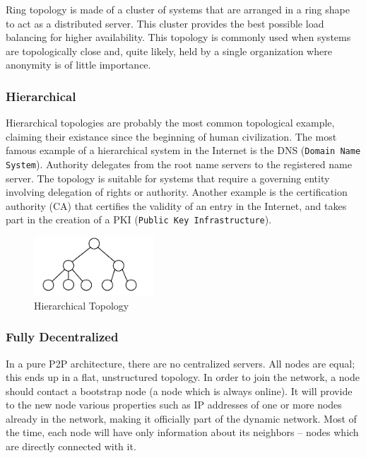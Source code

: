 Ring topology is made of a cluster of systems that are arranged in a ring shape
to act as a distributed server. This cluster provides the best possible load
balancing for higher availability. This topology is commonly used when systems
are topologically close and, quite likely, held by a single organization where
anonymity is of little importance.

\subsubsection{Hierarchical}

Hierarchical topologies are probably the most common topological example,
claiming their existance since the beginning of human civilization. The most
famous example of a hierarchical system in the Internet is the DNS
(\texttt{Domain Name System}). Authority delegates from the root name servers
to the registered name server. The topology is suitable for systems that
require a governing entity involving delegation of rights or authority.
Another example is the certification authority (CA) that certifies the
validity of an entry in the Internet, and takes part in the creation of a PKI
(\texttt{Public Key Infrastructure}).

\begin{figure}
  \centering
  \includegraphics[width=0.4\textwidth]{src/img/p2p-systems/hierarchical}
  \caption{Hierarchical Topology}
  \label{fig:p2p-systems:hierarchical}
\end{figure}

\subsubsection{Fully Decentralized}

In a pure P2P architecture, there are no centralized servers. All nodes are
equal; this ends up in a flat, unstructured topology. In order to join the
network, a node should contact a bootstrap node (a node which is always online).
It will provide to the new node various properties such as IP addresses of one
or more nodes already in the network, making it officially part of the dynamic
network. Most of the time, each node will have only information about its
neighbors -- nodes which are directly connected with it.

